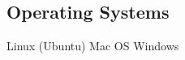 \documentclass[]{resume}
\begin{document}
\begin{minipage}[t]{0.33\textwidth}
\subsection{Operating Systems}
Linux (Ubuntu) \textbullet{} Mac OS \textbullet{} Windows
\sectionsep

%
%

\end{minipage} 
\hfill
\end{document}
